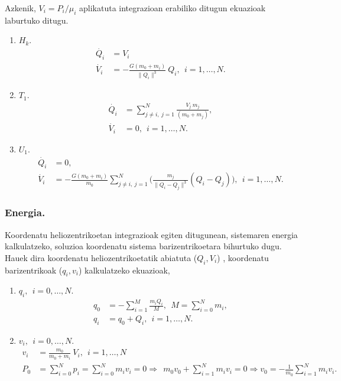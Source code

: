 Azkenik, $V_i=P_i/\mu_i$ aplikatuta integrazioan erabiliko ditugun ekuazioak laburtuko ditugu.
\begin{enumerate}
\item $H_k$.
\begin{align*}
\dot{Q_i} &=V_i \\
\dot{V_i} &= - \frac{G(m_0+m_i)}{\|Q_i\|^3 }\ Q_i,  \ \ i=1,\dots, N.
\end{align*}

\item $T_1$.
\begin{align*}
\dot{Q_i} &=\sum\limits_{j\ne i,\ j=1}^{N} \frac{V_j \ m_j}{(m_0+m_j)}, \\ 
\dot{V_i} &= 0, \ \ i=1,\dots, N.
\end{align*}

\item $U_1$.
\begin{align*}
\dot{Q_i} &=0, \\ 
\dot{V_i} &= - \frac{G(m_0+m_i)}{m_0}
                    \sum\limits_{j \ne i , \ j=1}^{N} \bigg( \frac{m_j}{\|Q_i-Q_j\|^3} (Q_i-Q_j)     \bigg), \ \ i=1,\dots, N.
\end{align*}

\end{enumerate}

\subsubsection*{Energia.}

Koordenatu heliozentrikoetan integrazioak egiten ditugunean, sistemaren energia kalkulatzeko, soluzioa koordenatu sistema barizentrikoetara bihurtuko dugu. Hauek dira koordenatu heliozentrikoetatik abiatuta ($Q_i,V_i$) , koordenatu barizentrikoak ($q_i,v_i$) kalkulatzeko ekuazioak,

\begin{enumerate}
\item $q_i, \ \ i=0,\dots,N$. 
\begin{align*}
q_0 &=-\sum\limits_{i=1}^{M} \frac{m_i Q_i}{M}, \ \ M= \sum\limits_{i=0}^{N} m_i, \\
q_i &=q_0+Q_i, \ \ i=1,\dots,N.
\end{align*}

\item $v_i, \ \ i=0,\dots,N$. 
\begin{align*}
v_i &=\frac{m_0}{m_0+m_i} \ V_i, \ \ i=1,\dots,N \\
P_0 &=\sum\limits_{i=0}^{N} p_i=\sum\limits_{i=0}^{N} m_i v_i=0 \Rightarrow \ \  m_0v_0+ \sum\limits_{i=1}^{N} m_i v_i=0 \Rightarrow v_0=-\frac{1}{m_0} \sum\limits_{i=1}^{N} m_i v_i. 
\end{align*}

\end{enumerate}


